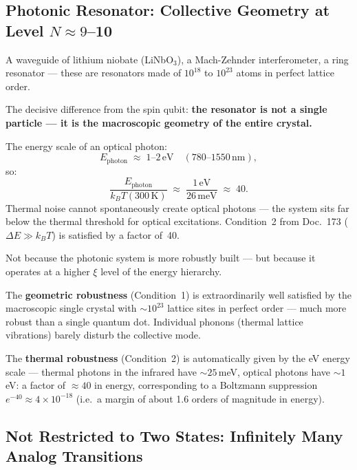 \subsection{Photonic Resonator: Collective Geometry at Level
  \texorpdfstring{$N \approx 9$--10}{N≈9-10}}

A waveguide of lithium niobate (LiNbO$_3$),
a Mach-Zehnder interferometer, a ring resonator ---
these are resonators made of $10^{18}$ to $10^{23}$ atoms
in perfect lattice order.

The decisive difference from the spin qubit:
\textbf{the resonator is not a single particle ---
it is the macroscopic geometry of the entire crystal.}

The energy scale of an optical photon:
\begin{equation}
  E_\text{photon} \;\approx\; 1\text{--}2\,\text{eV}
  \quad (780\text{--}1550\,\text{nm}),
\end{equation}
so:
\begin{equation}
  \frac{E_\text{photon}}{k_BT(300\,\text{K})}
  \;\approx\; \frac{1\,\text{eV}}{26\,\text{meV}}
  \;\approx\; 40.
\end{equation}
Thermal noise cannot spontaneously create optical
photons --- the system sits far below
the thermal threshold for optical excitations.
Condition~2 from Doc.~173 ($\Delta E \gg k_BT$)
is satisfied by a factor of~40.

\begin{important}
Not because the photonic system is more robustly built ---
but because it operates at a higher $\xi$ level
of the energy hierarchy.

The \textbf{geometric robustness} (Condition~1)
is extraordinarily well satisfied by the macroscopic
single crystal with $\sim 10^{23}$ lattice sites in perfect order ---
much more robust than a single quantum dot.
Individual phonons (thermal lattice vibrations)
barely disturb the collective mode.

The \textbf{thermal robustness} (Condition~2)
is automatically given by the eV energy scale ---
thermal photons in the infrared have $\sim 25$\,meV,
optical photons have $\sim 1$\,eV:
a factor of $\approx 40$ in energy, corresponding to a
Boltzmann suppression $e^{-40} \approx 4\times10^{-18}$
(i.e.\ a margin of about 1.6 orders of magnitude in energy).
\end{important}

\subsection{Not Restricted to Two States:
  Infinitely Many Analog Transitions}

